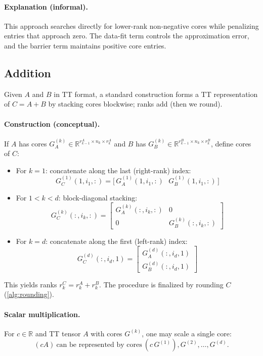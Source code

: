 \documentclass[11pt,a4paper,parskip=half-]{scrartcl}
\theoremstyle{definition}
\theoremstyle{plain}
\theoremstyle{remark}
\begin{document}
\paragraph{Explanation (informal).}
This approach searches directly for lower-rank non-negative cores while
penalizing entries that approach zero. The data-fit term controls the
approximation error, and the barrier term maintains positive core entries.

\subsection{Addition}

Given $A$ and $B$ in TT format, a standard construction forms a TT
representation of
$C=A+B$ by stacking cores blockwise; ranks add (then we round).

\paragraph{Construction (conceptual).}
If $A$ has cores $G_A^{(k)} \in \mathbb{R}^{r_{k-1}^A \times n_k \times r_k^A}$
and $B$ has $G_B^{(k)} \in \mathbb{R}^{r_{k-1}^B \times n_k \times r_k^B}$,
define cores of $C$:

\begin{itemize}[leftmargin=2em]
  \item For $k=1$: concatenate along the last (right-rank) index:
    \[
      G_C^{(1)}(1,i_1,:) = \big[\,G_A^{(1)}(1,i_1,:)
      \ \ \ G_B^{(1)}(1,i_1,:)\,\big]
    \]
  \item For $1<k<d$: block-diagonal stacking:
    \[
      G_C^{(k)}(:,i_k,:) =
      \begin{bmatrix}
        G_A^{(k)}(:,i_k,:) & 0\\
        0 & G_B^{(k)}(:,i_k,:)
      \end{bmatrix}
    \]
  \item For $k=d$: concatenate along the first (left-rank) index:
    \[
      G_C^{(d)}(:,i_d,1) =
      \begin{bmatrix}
        G_A^{(d)}(:,i_d,1)\\
        G_B^{(d)}(:,i_d,1)
      \end{bmatrix}
    \]
\end{itemize}

This yields ranks $r_k^C = r_k^A + r_k^B$. The procedure is finalized by
rounding $C$ (\cref{alg:rounding}).

\paragraph{Scalar multiplication.}
For $c\in\mathbb{R}$ and TT tensor $A$ with cores $G^{(k)}$, one may
scale a single core:
\[
  (cA)\ \text{can be represented by cores}\ (c\,G^{(1)}),G^{(2)},\dots,G^{(d)}.
\]
\end{document}
